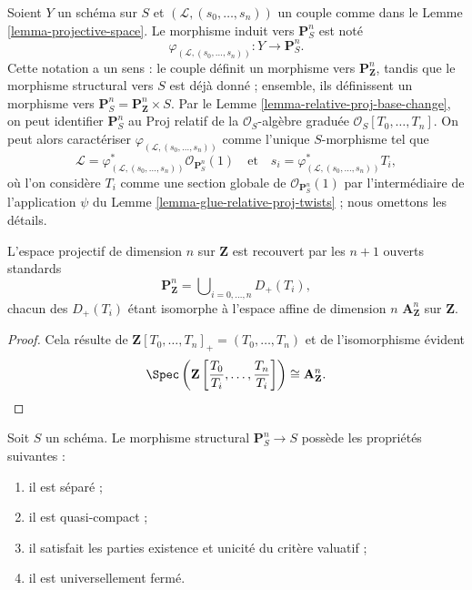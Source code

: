\noindent
Soient $Y$ un schéma sur $S$ et
$(\mathcal{L}, (s_0, \ldots, s_n))$ un couple comme dans le
Lemme \ref{lemma-projective-space}. Le morphisme induit vers
$\mathbf{P}^n_S$ est noté
$$
\varphi_{(\mathcal{L}, (s_0, \ldots, s_n))} :
Y \longrightarrow \mathbf{P}^n_S.
$$
Cette notation a un sens : le couple définit un morphisme vers
$\mathbf{P}^n_{\mathbf{Z}}$, tandis que le morphisme structural vers $S$ est
déjà donné ; ensemble, ils définissent un morphisme vers
$\mathbf{P}^n_S = \mathbf{P}^n_{\mathbf{Z}} \times S$.
Par le Lemme \ref{lemma-relative-proj-base-change}, on peut identifier
$\mathbf{P}^n_S$ au Proj relatif de la $\mathcal{O}_S$-algèbre graduée
$\mathcal{O}_S[T_0, \ldots, T_n]$. On peut alors caractériser
$\varphi_{(\mathcal{L}, (s_0, \ldots, s_n))}$ comme l'unique $S$-morphisme tel
que
$$
\mathcal{L} =
\varphi_{(\mathcal{L}, (s_0, \ldots, s_n))}^*\mathcal{O}_{\mathbf{P}^n_S}(1)
\quad
\text{et}
\quad
s_i = \varphi_{(\mathcal{L}, (s_0, \ldots, s_n))}^*T_i,
$$
où l'on considère $T_i$ comme une section globale de
$\mathcal{O}_{\mathbf{P}^n_S}(1)$ par l'intermédiaire de l'application $\psi$
du Lemme \ref{lemma-glue-relative-proj-twists} ; nous omettons les détails.

\begin{lemma}
\label{lemma-standard-covering-projective-space}
L'espace projectif de dimension $n$ sur $\mathbf{Z}$ est recouvert par les
$n + 1$ ouverts standards
$$
\mathbf{P}^n_{\mathbf{Z}} =
\bigcup\nolimits_{i = 0, \ldots, n} D_{+}(T_i),
$$
chacun des $D_{+}(T_i)$ étant isomorphe à l'espace affine de dimension $n$
$\mathbf{A}^n_{\mathbf{Z}}$ sur $\mathbf{Z}$.
\end{lemma}

\begin{proof}
Cela résulte de
$\mathbf{Z}[T_0, \ldots, T_n]_{+} = (T_0, \ldots, T_n)$ et de l'isomorphisme
évident
$$
\Spec
\left(
\mathbf{Z}
\left[\frac{T_0}{T_i}, \ldots, \frac{T_n}{T_i}
\right]
\right)
\cong
\mathbf{A}^n_{\mathbf{Z}}.
$$
\end{proof}

\begin{lemma}
\label{lemma-projective-space-separated}
Soit $S$ un schéma. Le morphisme structural $\mathbf{P}^n_S \to S$
possède les propriétés suivantes :
\begin{enumerate}
\item il est séparé ;
\item il est quasi-compact ;
\item il satisfait les parties existence et unicité du critère valuatif ;
\item il est universellement fermé.
\end{enumerate}
\end{lemma}

